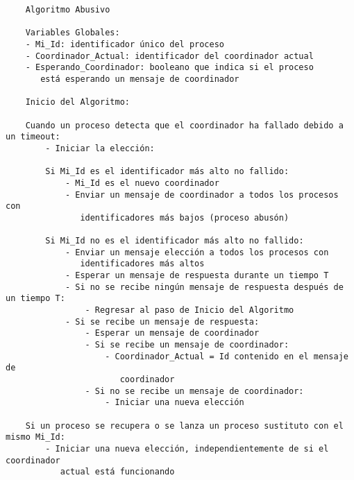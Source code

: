 \documentclass[a4paper,12pt]{article}
\begin{document}
\begin{verbatim}
    Algoritmo Abusivo

    Variables Globales:
    - Mi_Id: identificador único del proceso
    - Coordinador_Actual: identificador del coordinador actual
    - Esperando_Coordinador: booleano que indica si el proceso 
       está esperando un mensaje de coordinador
    
    Inicio del Algoritmo:
    
    Cuando un proceso detecta que el coordinador ha fallado debido a un timeout:
        - Iniciar la elección:
        
        Si Mi_Id es el identificador más alto no fallido:
            - Mi_Id es el nuevo coordinador
            - Enviar un mensaje de coordinador a todos los procesos con 
               identificadores más bajos (proceso abusón)
    
        Si Mi_Id no es el identificador más alto no fallido:
            - Enviar un mensaje elección a todos los procesos con 
               identificadores más altos
            - Esperar un mensaje de respuesta durante un tiempo T
            - Si no se recibe ningún mensaje de respuesta después de un tiempo T:
                - Regresar al paso de Inicio del Algoritmo
            - Si se recibe un mensaje de respuesta:
                - Esperar un mensaje de coordinador
                - Si se recibe un mensaje de coordinador:
                    - Coordinador_Actual = Id contenido en el mensaje de 
                       coordinador
                - Si no se recibe un mensaje de coordinador:
                    - Iniciar una nueva elección
    
    Si un proceso se recupera o se lanza un proceso sustituto con el mismo Mi_Id:
        - Iniciar una nueva elección, independientemente de si el coordinador 
           actual está funcionando
\end{verbatim}

\end{document}
